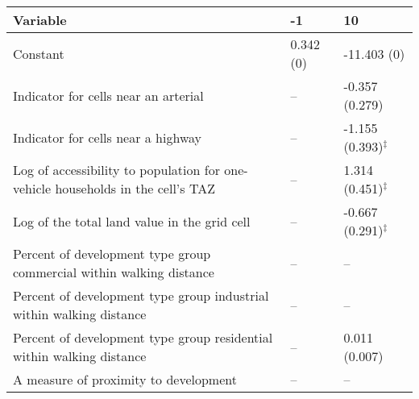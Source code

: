 
\begin{tabular}{p{3in}p{0.5in}p{0.5in}}
\hline\hline
Variable & -1 & 10 \\\hline
Constant & 0.342 (0) & -11.403 (0) \\
Indicator for cells near an arterial & -- & -0.357 (0.279) \\
Indicator for cells near a highway & -- & -1.155 (0.393)$^{\ddagger}$ \\
Log of accessibility to population for one-vehicle households in the cell's TAZ & -- & 1.314 (0.451)$^{\ddagger}$ \\
Log of the total land value in the grid cell & -- & -0.667 (0.291)$^{\ddagger}$ \\
Percent of development type group commercial within walking distance & -- & -- \\
Percent of development type group industrial within walking distance & -- & -- \\
Percent of development type group residential within walking distance & -- & 0.011 (0.007) \\
A measure of proximity to development & -- & -- \\
\hline\hline
\end{tabular}
